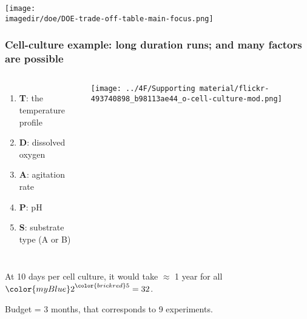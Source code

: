 \documentclass[handout,11pt,aspectratio=169,mathserif]{beamer}
\begin{document}
\begin{frame}\frametitle{}
	\centerline{\texttt{[image: \\imagedir/doe/DOE-trade-off-table-main-focus.png]}}
\end{frame}

\begin{frame}\frametitle{Cell-culture example: long duration runs; and many factors are possible}
	\newcommand{\white}{\color{white}}
	\begin{columns}[c]
			\begin{enumerate}
				\item	\textbf{T}: the temperature profile
				\item	\textbf{D}: dissolved oxygen
				\item	\textbf{A}: agitation rate
				\item	\textbf{P}: pH
				\item	\textbf{S}: substrate type (A or B)
			\end{enumerate}
		
			
			\vspace{0.2cm}
			
			\centerline{\texttt{[image: ../4F/Supporting material/flickr-493740898\_b98113ae44\_o-cell-culture-mod.png]}}
	\end{columns}

	\vfill
	At 10 days per cell culture, it would take $\approx$ 1 year for all  ${\color{myBlue} 2}^{\color{brickred} 5} = 32$.
	
	Budget = 3 months, {\color{myOrange} that corresponds to 9 experiments}.
		
\end{frame}
\end{document}
